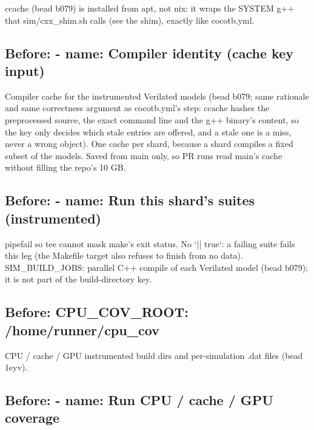 \begin{record}
\begin{textblock}
ccache (bead b079) is installed from apt, not nix: it wraps the SYSTEM g++ that
sim/cxx_shim.sh calls (see the shim), exactly like cocotb.yml.
\end{textblock}

\subsection*{Before: - name: Compiler identity (cache key input)}

\begin{textblock}
Compiler cache for the instrumented Verilated models (bead b079; same rationale and same
correctness argument as cocotb.yml's step: ccache hashes the preprocessed source, the exact
command line and the g++ binary's content, so the key only decides which stale entries are
offered, and a stale one is a miss, never a wrong object).  One cache per shard, because a
shard compiles a fixed subset of the models.  Saved from main only, so PR runs read main's
cache without filling the repo's 10 GB.
\end{textblock}

\subsection*{Before: - name: Run this shard's suites (instrumented)}

\begin{textblock}
pipefail so tee cannot mask make's exit status.  No `|| true`: a failing suite fails this
leg (the Makefile target also refuses to finish from no data).  SIM_BUILD_JOBS: parallel C++
compile of each Verilated model (bead b079); it is not part of the build-directory key.
\end{textblock}

\subsection*{Before: CPU\_COV\_ROOT: /home/runner/cpu\_cov}

\begin{textblock}
CPU / cache / GPU instrumented build dirs and per-simulation .dat files (bead 1eyv).
\end{textblock}

\subsection*{Before: - name: Run CPU / cache / GPU coverage}


\end{record}
